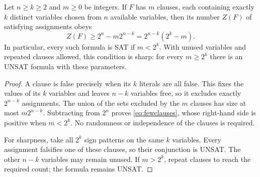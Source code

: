 \begin{proposition}
\label{prop:fewclauses}
Let $n\ge k\ge2$ and $m\ge0$ be integers. If $F$ has $m$ clauses, each
containing exactly $k$ distinct variables chosen from $n$ available variables,
then its number $Z(F)$ of satisfying assignments obeys
\begin{equation}
 Z(F)\ge 2^n-m2^{n-k}=2^{n-k}(2^k-m).
 \label{eq:fewclauses}
\end{equation}
In particular, every such formula is SAT if $m<2^k$. With unused variables
and repeated clauses allowed, this condition is sharp: for every $m\ge2^k$
there is an UNSAT formula with these parameters.
\end{proposition}
\begin{proof}
A clause is false precisely when its $k$ literals are all false. This fixes
the values of its $k$ variables and leaves $n-k$ variables free, so it
excludes exactly $2^{n-k}$ assignments. The union of the sets excluded by
the $m$ clauses has size at most $m2^{n-k}$. Subtracting from $2^n$ proves
\eqref{eq:fewclauses}, whose right-hand side is positive when $m<2^k$.
No randomness or independence of the clauses is required.

For sharpness, take all $2^k$ sign patterns on the same $k$ variables.
Every assignment falsifies one of these clauses, so their conjunction is
UNSAT. The other $n-k$ variables may remain unused. If $m>2^k$, repeat
clauses to reach the required count; the formula remains UNSAT.
\end{proof}
